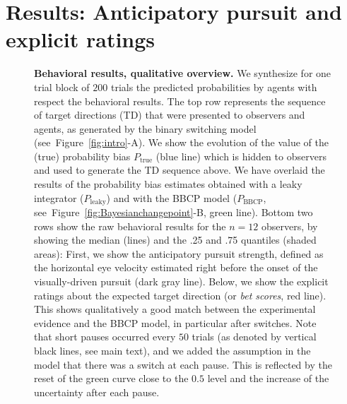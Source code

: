 \documentclass[10pt,letterpaper]{article}
\newcommand{\seeFig}[1]{Figure~\ref{fig:#1}}
\begin{document}
\section{Results: Anticipatory pursuit and explicit ratings}
\label{sec:results_psycho}
\begin{figure}%
\caption{
\textbf{Behavioral results, qualitative overview.} %
We synthesize for one trial block of $200$ trials the predicted probabilities by agents with respect the behavioral results.
The top row represents the sequence of target directions (TD)
that were presented to observers and agents,
as generated by the binary switching model (see~\seeFig{intro}-A).
We show the evolution of the value
of the (true) probability bias $P_{\text{true}}$ (blue line)
which is hidden to observers
and used to generate the TD sequence above.
We have overlaid the results of
the probability bias estimates obtained with a leaky integrator ($P_{\text{leaky}}$)
and with the BBCP model ($P_{\text{BBCP}}$, see~\seeFig{Bayesianchangepoint}-B, green line).
Bottom two rows show the raw behavioral results
for the $n=12$ observers, by showing the median (lines) and the .25 and .75 quantiles (shaded areas):
First, we show the  anticipatory pursuit strength, defined
as the horizontal eye velocity estimated right before
the onset of the visually-driven pursuit (dark gray line).
Below, we show the explicit ratings about the expected target direction (or \textit{bet scores}, red line).
This shows qualitatively a good match between
the experimental evidence and the BBCP model,
in particular after switches.
Note that short pauses occurred every $50$ trials
(as denoted by vertical black lines, see main text),
and we added the assumption in the model
that there was a switch at each pause.
This is reflected by the reset of the green curve close to the $0.5$ level and
the increase of the uncertainty after each pause. %
}
\label{fig:results_psycho}
\end{figure}
\end{document}
